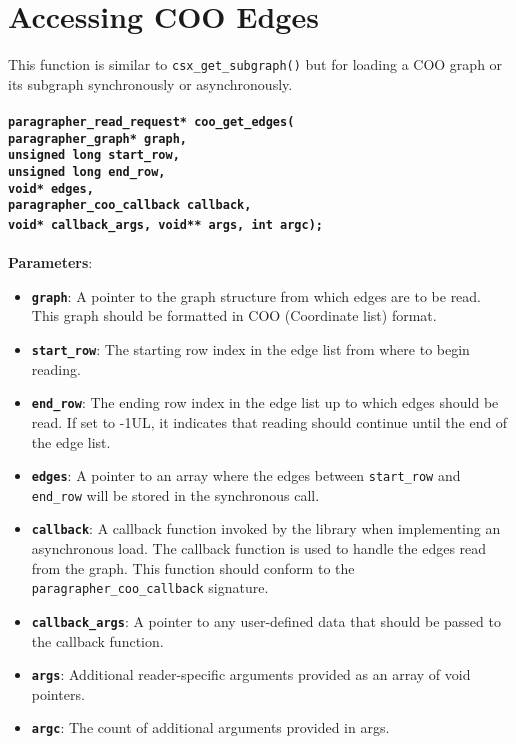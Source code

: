 \documentclass[a4paper]{article}
\begin{document}
\section{Accessing COO Edges}
This function is similar to \verb|csx_get_subgraph()| but for loading a COO graph
or its subgraph synchronously or asynchronously.
~\\
\\
\textbf{\texttt{paragrapher\_read\_request* coo\_get\_edges(
\\{\indent}paragrapher\_graph* graph,
\\{\indent}unsigned long start\_row,
\\{\indent}unsigned long end\_row,
\\{\indent}void* edges,
\\{\indent}paragrapher\_coo\_callback callback,
\\{\indent}void* callback\_args, void** args, int argc);}}
    ~\\
    \\
\textbf{Parameters}:
\begin{itemize}
    \setlength{\itemsep}{0pt}
    \setlength{\parskip}{0pt}
    \setlength{\parsep}{0pt}

        \item \textbf{\texttt{graph}}: A pointer to the graph structure from which edges are to be read. This graph should be formatted in COO (Coordinate list) format.
        \item \textbf{\texttt{start\_row}}: The starting row index in the edge list from where to begin reading.
        \item \textbf{\texttt{end\_row}}: The ending row index in the edge list up to which edges should be read. If set to -1UL, it indicates that reading should continue until the end of the edge list.
        \item \textbf{\texttt{edges}}: A pointer to an array where the edges between \texttt{start\_row} and \texttt{end\_row} will be stored in the synchronous call.
        \item \textbf{\texttt{callback}}: A callback function invoked by the library when implementing an asynchronous load. The callback function is used to handle the edges read from the graph. This function should conform to the \texttt{paragrapher\_coo\_callback} signature.
        \item \textbf{\texttt{callback\_args}}: A pointer to any user-defined data that should be passed to the callback function.
        \item \textbf{\texttt{args}}: Additional reader-specific arguments provided as an array of void pointers.
        \item \textbf{\texttt{argc}}: The count of additional arguments provided in args.
\end{itemize}
\end{document}
